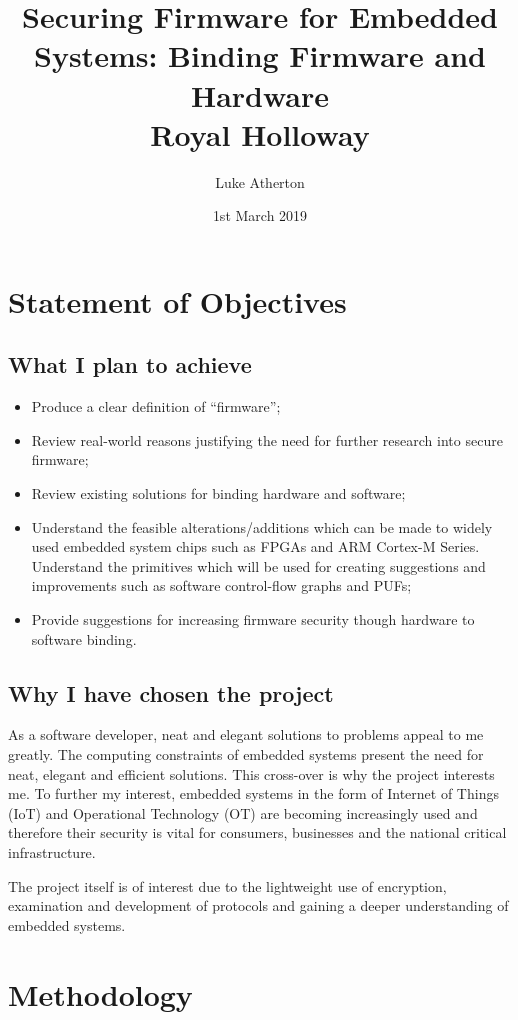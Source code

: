 \documentclass[10pt]{report}
\title{
	{Securing Firmware for Embedded Systems: Binding Firmware and Hardware}\\
	{\large Royal Holloway}\\
}
\author{Luke Atherton}
\date{1st March 2019}
\begin{document}
\maketitle

\chapter*{Statement of Objectives}

\section*{What I plan to achieve}
\begin{itemize}
	\item Produce a clear definition of ``firmware'';
	\item Review real-world reasons justifying the need for further research into secure firmware;
	\item Review existing solutions for binding hardware and software;
	\item Understand the feasible alterations/additions which can be made to widely used embedded system chips such as FPGAs and ARM Cortex-M Series. Understand the primitives which will be used for creating suggestions and improvements such as software control-flow graphs and PUFs;
	\item Provide suggestions for increasing firmware security though hardware to software binding.
\end{itemize}

\section*{Why I have chosen the project}
As a software developer, neat and elegant solutions to problems appeal to me greatly. The computing constraints of embedded systems present the need for neat, elegant and efficient solutions. This cross-over is why the project interests me. To further my interest, embedded systems in the form of Internet of Things (IoT) and Operational Technology (OT) are becoming increasingly used and therefore their security is vital for consumers, businesses and the national critical infrastructure.

The project itself is of interest due to the lightweight use of encryption, examination and development of protocols and gaining a deeper understanding of embedded systems.

\chapter*{Methodology}
\end{document}
